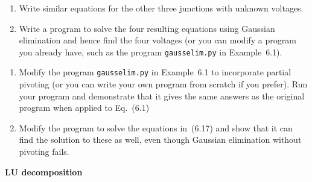 \documentclass[12pt]{article}
\begin{document}
\begin{exercises}
\begin{enumerate}\setlength{\itemsep}{0pt}
\item Write similar equations for the other three junctions with unknown
voltages.
\item Write a program to solve the four resulting equations using Gaussian
  elimination and hence find the four voltages (or you can modify a program
  you already have, such as the program \verb|gausselim.py| in
  Example~6.1).
\end{enumerate}



\exercise
\begin{enumerate}\setlength{\itemsep}{0pt}
\item Modify the program \verb|gausselim.py| in Example~6.1 to incorporate
  partial pivoting (or you can write your own program from scratch if you
  prefer).  Run your program and demonstrate that it gives the same answers
  as the original program when applied to Eq.~(6.1)
\item Modify the program to solve the equations in~(6.17) and show that it
  can find the solution to these as well, even though Gaussian elimination
  without pivoting fails.
\end{enumerate}



\exercise \textbf{LU decomposition}


\end{exercises}
\end{document}
